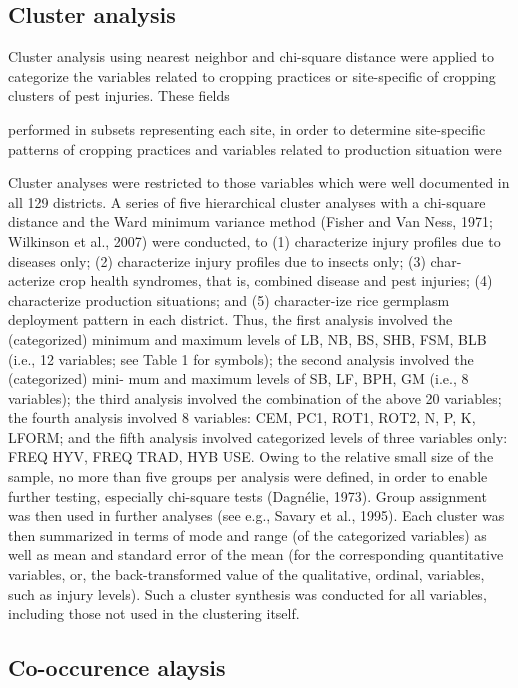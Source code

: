 \documentclass{frontiersSCNS} %
\begin{document}
\subsection*{Cluster analysis}
Cluster analysis using nearest neighbor and chi-square distance were applied to categorize the variables related to cropping practices or site-specific of cropping clusters of pest injuries. These fields

 performed  in subsets representing each site, in order to determine site-specific patterns of cropping practices and variables related to production situation were
 
Cluster analyses were restricted to those variables which were well documented in all 129 districts. A series of five hierarchical cluster analyses with a chi-square distance and the Ward minimum variance method (Fisher and Van Ness, 1971; Wilkinson et al., 2007) were conducted, to (1) characterize injury profiles due to diseases only; (2) characterize injury profiles due to insects only; (3) char- acterize crop health syndromes, that is, combined disease and pest injuries; (4) characterize production situations; and (5) character-ize rice germplasm deployment pattern in each district. Thus, the first analysis involved the (categorized) minimum and maximum levels of LB, NB, BS, SHB, FSM, BLB (i.e., 12 variables; see Table 1 for symbols); the second analysis involved the (categorized) mini- mum and maximum levels of SB, LF, BPH, GM (i.e., 8 variables); the third analysis involved the combination of the above 20 variables; the fourth analysis involved 8 variables: CEM, PC1, ROT1, ROT2, N, P, K, LFORM; and the fifth analysis involved categorized levels of three variables only: FREQ HYV, FREQ TRAD, HYB USE. Owing to the relative small size of the sample, no more than five groups per analysis were defined, in order to enable further testing, especially chi-square tests (Dagnélie, 1973). Group assignment was then used in further analyses (see e.g., Savary et al., 1995).
Each cluster was then summarized in terms of mode and range (of the categorized variables) as well as mean and standard error of the mean (for the corresponding quantitative variables, or, the back-transformed value of the qualitative, ordinal, variables, such as injury levels). Such a cluster synthesis was conducted for all variables, including those not used in the clustering itself.


\subsection*{Co-occurence alaysis}
\end{document}
